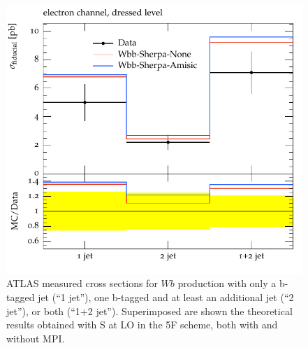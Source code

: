 \documentclass[11pt]{cernrep}
\newcommand{\Sherpa}{S\protect\scalebox{0.8}{HERPA}\xspace}
\begin{document}
\begin{figure}[htbp]
\begin{center}
   \includegraphics[scale=0.65]{figs/wbb/sherpa/d01-x01-y02.pdf}
\end{center}
\caption{ATLAS measured cross sections for $Wb$ production with only a b-tagged jet (``1
  jet''), one b-tagged and at least an additional jet (``2 jet''), or both (``1+2 jet'').
  Superimposed are shown the theoretical results obtained with \Sherpa
  at LO in the 5F scheme, both with and without MPI.} 
\label{fig:wbb-njet-sherpa}
\end{figure}
\end{document}
